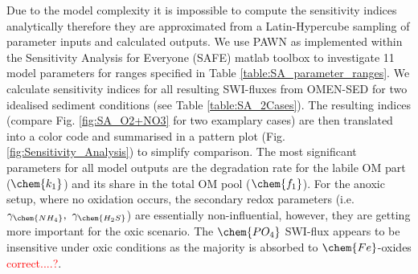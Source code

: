 \documentclass[gmd, manuscript]{copernicus}
\begin{document}
Due to the model complexity it is impossible to compute the sensitivity indices analytically therefore they are approximated from a Latin-Hypercube sampling of parameter inputs and calculated outputs.
We use PAWN as implemented within the Sensitivity Analysis for Everyone (SAFE) matlab toolbox \citep{pianosi_matlab_2015} to investigate 11 model parameters for ranges specified in Table \ref{table:SA_parameter_ranges}. 
We calculate sensitivity indices for all resulting SWI-fluxes from OMEN-SED for two idealised sediment conditions (see Table \ref{table:SA_2Cases}). 
The resulting indices (compare Fig. \ref{fig:SA_O2+NO3} for two examplary cases) are then translated into a color code and summarised in a pattern plot (Fig. \ref{fig:Sensitivity_Analysis}) to simplify comparison. 
The most significant parameters for all model outputs are the degradation rate for the labile OM part ($\chem{k_1}$) and its share in the total OM pool ($\chem{f_1}$).
For the anoxic setup, where no oxidation occurs, the secondary redox parameters (i.e. $\gamma_\chem{NH_4},\ \gamma_\chem{H_2S}$) are essentially non-influential, however, they are getting more important for the oxic scenario. 
The $\chem{PO_4}$ SWI-flux appears to be insensitive under oxic conditions as the majority is absorbed to $\chem{Fe}$-oxides \textcolor{red}{correct....?}.
\end{document}
